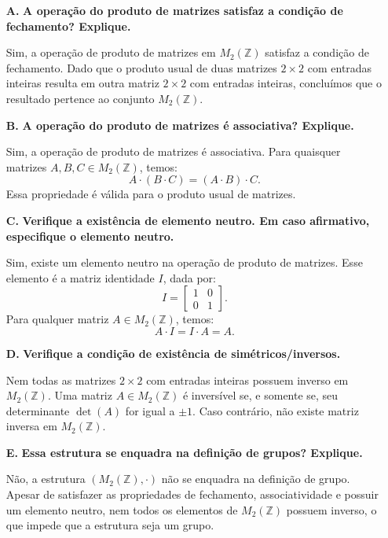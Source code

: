 \documentclass{article}
\begin{document}
\begin{enumerate}
    \item[\textbf{A.}] \textbf{A operação do produto de matrizes satisfaz a condição de fechamento? Explique.}

    Sim, a operação de produto de matrizes em $M_2(\mathbb{Z})$ satisfaz a condição de fechamento. Dado que o produto usual de duas matrizes $2 \times 2$ com entradas inteiras resulta em outra matriz $2 \times 2$ com entradas inteiras, concluímos que o resultado pertence ao conjunto $M_2(\mathbb{Z})$.

    \item[\textbf{B.}] \textbf{A operação do produto de matrizes é associativa? Explique.}

    Sim, a operação de produto de matrizes é associativa. Para quaisquer matrizes $A, B, C \in M_2(\mathbb{Z})$, temos:
    \[
    A \cdot (B \cdot C) = (A \cdot B) \cdot C.
    \]
    Essa propriedade é válida para o produto usual de matrizes.

    \item[\textbf{C.}] \textbf{Verifique a existência de elemento neutro. Em caso afirmativo, especifique o elemento neutro.}

    Sim, existe um elemento neutro na operação de produto de matrizes. Esse elemento é a matriz identidade $I$, dada por:
    \[
    I = \begin{bmatrix}
    1 & 0 \\
    0 & 1
    \end{bmatrix}.
    \]
    Para qualquer matriz $A \in M_2(\mathbb{Z})$, temos:
    \[
    A \cdot I = I \cdot A = A.
    \]

    \item[\textbf{D.}] \textbf{Verifique a condição de existência de simétricos/inversos.}

    Nem todas as matrizes $2 \times 2$ com entradas inteiras possuem inverso em $M_2(\mathbb{Z})$. Uma matriz $A \in M_2(\mathbb{Z})$ é inversível se, e somente se, seu determinante $\det(A)$ for igual a $\pm 1$. Caso contrário, não existe matriz inversa em $M_2(\mathbb{Z})$.

    \item[\textbf{E.}] \textbf{Essa estrutura se enquadra na definição de grupos? Explique.}

    Não, a estrutura $(M_2(\mathbb{Z}), \cdot)$ não se enquadra na definição de grupo. Apesar de satisfazer as propriedades de fechamento, associatividade e possuir um elemento neutro, nem todos os elementos de $M_2(\mathbb{Z})$ possuem inverso, o que impede que a estrutura seja um grupo.

\end{enumerate}
\end{document}
